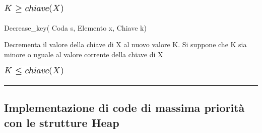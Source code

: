\documentclass{article}
\begin{document}
\includegraphics{images/image142.png}

{}

{Decrease\_key( Coda s, Elemento x, Chiave k)}

{Decrementa il valore della chiave di X al nuovo valore K. Si suppone
che K sia minore o uguale al valore corrente della chiave di X}

\includegraphics{images/image143.png}

{}

\begin{center}\rule{0.5\linewidth}{\linethickness}\end{center}

\subsection{\texorpdfstring{{}}{}}\label{h.7vrdkvwj5vt}

\hypertarget{h.aocay3iqens1}{\subsection{\texorpdfstring{{Implementazione
di code di massima priorità con le strutture
Heap}}{Implementazione di code di massima priorità con le strutture Heap}}\label{h.aocay3iqens1}}

{}

\protect\hypertarget{t.fb709a8e208067c1bfab491f087053eba0be66c5}{}{}\protect\hypertarget{t.19}{}{}
\end{document}
